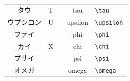 \documentclass{ltjsbook}
\begin{document}
\begin{table}[ht]
\begin{tabular}{ccccl}
		タウ    & $\mathrm{T}$  & \tau         & tau     & \verb|\tau|        \\
		ウプシロン & $\mathrm{U}$  & \upsilon     & upsilon & \verb|\upsilon|    \\
		ファイ   & \Phi          & \phi         & phi     & \verb|\phi|        \\
		カイ    & $\mathrm{X}$  & \chi         & chi     & \verb|\chi|        \\
		プサイ   & \Psi          & \psi         & psi     & \verb|\psi|        \\
		オメガ   & \Omega        & \omega       & omega   & \verb|\omega|      \\\hline
	\end{tabular}
\end{table}
\end{document}
